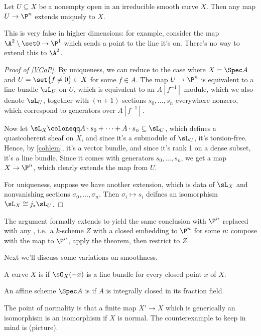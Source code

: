 \begin{thm}
\label{VCoP}
Let $U\subseteq X$ be a nonempty open in an irreducible smooth curve $X$. Then any map $U\to\P^n$ extends uniquely
to $X$.
\end{thm}
\begin{rem}
This is very false in higher dimensions: for example, consider the map $\A^2\setminus\set 0\to\P^1$ which sends a
point to the line it's on. There's no way to extend this to $\A^2$.
\end{rem}
\begin{proof}[Proof of \cref{VCoP}]
By uniqueness, we can reduce to the case where $X = \Spec A$ and $U = \set{f\ne 0}\subset X$ for some $f\in A$. The
map $U\to\P^n$ is equivalent to a line bundle $\sL_U$ on $U$, which is equivalent to an $A[f^{-1}]$-module, which
we also denote $\sL_U$, together with $(n+1)$ sections $s_0,\dotsc,s_n$ everywhere nonzero, which correspond to
generators over $A[f^{-1}]$.

Now let $\sL_X\coloneqq A\cdot s_0 + \dotsb + A\cdot s_n\subseteq\sL_U$, which defines a quasicoherent sheaf on
$X$, and since it's a submodule of $\sL_U$, it's torsion-free. Hence, by \cref{cohlem}, it's a vector bundle, and
since it's rank 1 on a dense subset, it's a line bundle. Since it comes with generators $s_0,\dotsc,s_n$, we get a
map $X\to\P^n$, which clearly extends the map from $U$.

For uniqueness, suppose we have another extension, which is data of $\sL_X$ and nonvanishing sections
$\sigma_0,\dotsc,\sigma_n$. Then $\sigma_i\mapsto s_i$ deifnes an isomorphism $\sL_X\cong j_*\sL_U$.
\end{proof}
\begin{rem}
The argument formally extends to yield the same conclusion with $\P^n$ replaced with any , i.e.\ a $k$-scheme $Z$ with a closed embedding to $\P^n$ for some $n$: compose with the map to $\P^n$,
apply the theorem, then restrict to $Z$.
\end{rem}
Next we'll discuss some variations on smoothness.
\begin{defn}
A curve $X$ is  if $\sO_X(-x)$ is a line bundle for every closed point $x$ of $X$.
\end{defn}
\begin{defn}
An affine scheme $\Spec A$ is  if $A$ is integrally closed in its fraction field.
\end{defn}
The point of normality is that a finite map $X'\to X$ which is generically an isomorphism is an isomorphism if $X$
is normal. The counterexample to keep in mind is (\TODO picture).

